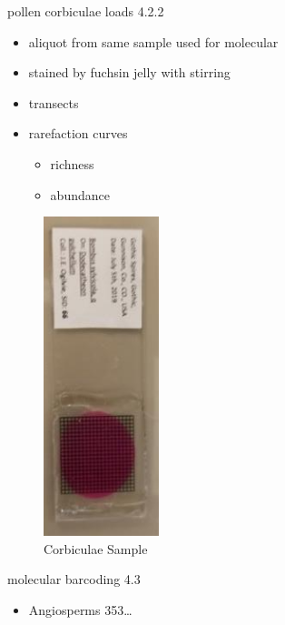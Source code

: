 \documentclass[
  ignorenonframetext,
]{beamer}
\providecommand{\tightlist}{%
  \setlength{\itemsep}{0pt}\setlength{\parskip}{0pt}}
\begin{document}
\begin{frame}{pollen corbiculae loads 4.2.2}
\protect\hypertarget{pollen-corbiculae-loads-4.2.2}{}
\begin{itemize}
\tightlist
\item
  aliquot from same sample used for molecular\\
\item
  stained by fuchsin jelly with stirring
\item
  transects\\
\item
  rarefaction curves

  \begin{itemize}
  \tightlist
  \item
    richness\\
  \item
    abundance
  \end{itemize}
\end{itemize}

\begin{figure}
\centering
\includegraphics[width=0.3\textwidth,height=\textheight]{../graphics/pictures/corbiculae_slide.resized.jpg}
\caption{Corbiculae Sample}
\end{figure}
\end{frame}

\begin{frame}{molecular barcoding 4.3}
\protect\hypertarget{molecular-barcoding-4.3}{}
\begin{itemize}
\tightlist
\item
  Angiosperms 353\ldots{}
\end{itemize}
\end{frame}
\end{document}
